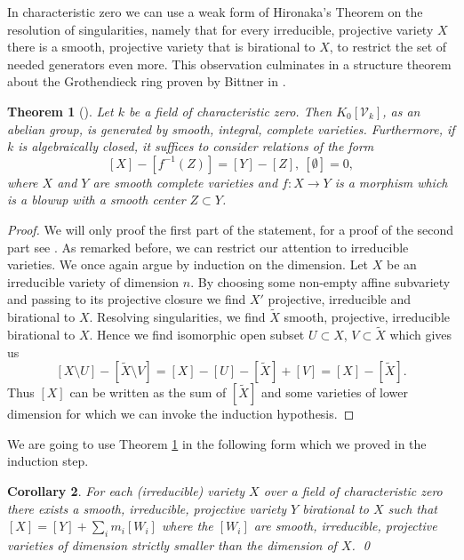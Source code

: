 \documentclass[11pt, a4paper, english, twoside]{article}
\theoremstyle{plain}
\newtheorem{theorem}{Theorem}[section]
\newtheorem{corollary}[theorem]{Corollary}
\theoremstyle{definition}
\newcommand{\gring}[1][k]{K_0[\mathcal{V}_#1]}
\begin{document}
In characteristic zero we can use a weak form of Hironaka's Theorem on the resolution of singularities, namely that for every irreducible, 
projective variety $X$ there is a smooth, projective variety that is birational to $X$, to restrict the set of needed generators even more. 
This observation culminates in a structure theorem about the Grothendieck ring proven by Bittner in \cite{Bittner}.


\begin{theorem}[{\cite[Thm. 3.1]{Bittner}}]
    \label{bittner}
    Let $k$ be a field of characteristic zero. Then $\gring[k]$, as an abelian group, is generated by smooth, integral, complete varieties.
    Furthermore, if $k$ is algebraically closed, it suffices to consider relations of the form
    \[
        [X] - [f^{-1}(Z)] = [Y] - [Z],\ [\emptyset] = 0,
    \]
    where $X$ and $Y$ are smooth complete varieties and $f \colon X \to Y$ is a morphism which is a blowup with a smooth center $Z \subset Y$. 
\end{theorem}
\begin{proof}
    We will only proof the first part of the statement, for a proof of the second part see \cite{Bittner}. As remarked before, we can restrict our
    attention to irreducible varieties.  We once again argue by induction on the dimension.
    Let $X$ be an irreducible variety of dimension $n$. By choosing some non-empty affine subvariety and passing to its projective closure we
    find $X'$ projective, irreducible and birational to $X$. Resolving singularities, we find $\widetilde{X}$ smooth, projective, irreducible
    birational to $X$. Hence we find isomorphic open subset $U \subset X$, $V \subset \widetilde{X}$ which gives us
    \[
        [X \setminus U ] - [\widetilde{X} \setminus V] = [X] - [U] - [\widetilde{X}] + [V] = [X] - [\widetilde{X}].
    \]
    Thus $[X]$ can be written as the sum of $[\widetilde{X}]$ and some varieties of lower dimension for which we can invoke the induction
    hypothesis.
\end{proof}

We are going to use Theorem \ref{bittner} in the following form which we proved in the induction step.

\begin{corollary}
    \label{decomp}
    For each (irreducible) variety $X$ over a field of characteristic zero there exists a smooth, irreducible, projective variety $Y$ birational
    to $X$ such that $[X] = [Y] + \sum_i m_i[W_i]$ where the $[W_i]$ are smooth, irreducible, projective varieties of dimension strictly
    smaller than the dimension of $X$. \qed
\end{corollary}
\end{document}
